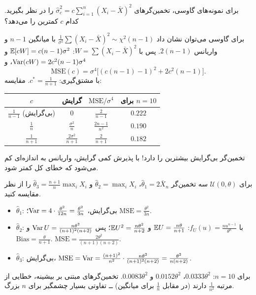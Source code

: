 \begin{example}
برای نمونه‌های  گاوسی، تخمین‌گرهای $\hat\sigma^2_c=c\sum_{i=1}^n(X_i-\bar X)^2$ را در نظر بگیرید. کدام $c$ کمترین  را می‌دهد؟
\begin{solution}
برای گاوسی می‌توان نشان داد $\frac{1}{\sigma^2}\sum(X_i-\bar X)^2\sim\chi^2(n-1)$ با میانگین $n-1$ و واریانس $2(n-1)$. پس با $W=\sum(X_i-\bar X)^2$:
$\mathbb{E}[cW]=c(n-1)\sigma^2$ و $\operatorname{Var}(cW)=2c^2(n-1)\sigma^4$، و
\[
\mathrm{MSE}(c)=\sigma^4\big[(c(n-1)-1)^2+2c^2(n-1)\big].
\]
با مشتق‌گیری: $c^*=\frac{1}{n+1}$. مقایسه:
\begin{center}
\renewcommand{\arraystretch}{1.4}
\begin{tabular}{c|c|c|c}
$c$ & گرایش & $\mathrm{MSE}/\sigma^4$ & برای $n=10$\\\hline
$\frac{1}{n-1}$ (بی‌گرایش) & $0$ & $\frac{2}{n-1}$ & $0.222$\\
$\frac1n$ & $\frac{\sigma^2}{n}$ & $\frac{2n-1}{n^2}$ & $0.190$\\
$\frac{1}{n+1}$ & $\frac{2\sigma^2}{n+1}$ & $\frac{2}{n+1}$ & $0.182$
\end{tabular}
\end{center}
تخمین‌گر بی‌گرایش بیشترین  را دارد! با پذیرش کمی گرایش، واریانس به اندازه‌ای کم می‌شود که خطای کل کمتر شود.
\end{solution}
\end{example}

\begin{example}
برای $\mathcal U(0,\theta)$ سه تخمین‌گر $\hat\theta_1=2\bar X_n$، $\hat\theta_2=\max_iX_i$ و $\hat\theta_3=\frac{n+1}{n}\max_iX_i$ را از نظر  مقایسه کنید.
\begin{solution}
\begin{itemize}
\item $\hat\theta_1$: بی‌گرایش، $\operatorname{Var}=4\cdot\frac{\theta^2}{12n}=\frac{\theta^2}{3n}$؛ $\mathrm{MSE}=\frac{\theta^2}{3n}$.
\item $\hat\theta_2$: با $f_U(u)=\frac{nu^{n-1}}{\theta^n}$: $\mathbb{E} U=\frac{n\theta}{n+1}$ و $\mathbb{E} U^2=\frac{n\theta^2}{n+2}$؛ پس $\operatorname{Var} U=\frac{n\theta^2}{(n+1)^2(n+2)}$ و $\mathrm{Bias}=\frac{\theta}{n+1}$. $\mathrm{MSE}=\frac{2\theta^2}{(n+1)(n+2)}$.
\item $\hat\theta_3$: بی‌گرایش، $\mathrm{MSE}=\operatorname{Var}=\frac{(n+1)^2}{n^2}\cdot\frac{n\theta^2}{(n+1)^2(n+2)}=\frac{\theta^2}{n(n+2)}$.
\end{itemize}
برای $n=10$: $0.0333\theta^2$، $0.0152\theta^2$ و $0.0083\theta^2$. تخمین‌گرهای مبتنی بر بیشینه، خطایی از مرتبه $\frac1{n^2}$ دارند (در مقابل $\frac1n$ برای میانگین) ــ تفاوتی بسیار چشمگیر برای $n$ بزرگ.
\end{solution}
\end{example}

